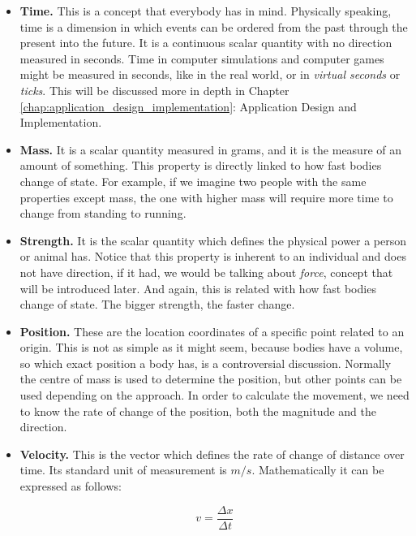 \begin{itemize}

\item{{\bf Time.} This is a concept that everybody has in mind. Physically speaking, time is a dimension in which events can be ordered from the past through the present into the future. It is a continuous scalar quantity with no direction measured in seconds. Time in computer simulations and computer games might be measured in seconds, like in the real world, or in \emph{virtual seconds} or \emph{ticks}. This will be discussed more in depth in Chapter \ref{chap:application_design_implementation}: Application Design and Implementation.}

\item{{\bf Mass.} It is a scalar quantity measured in grams, and it is the measure of an amount of something. This property is directly linked to how fast bodies change of state. For example, if we imagine two people with the same properties except mass, the one with higher mass will require more time to change from standing to running.}

\item{{\bf Strength.} It is the scalar quantity which defines the physical power a person or animal has. Notice that this property is inherent to an individual and does not have direction, if it had, we would be talking about \emph{force}, concept that will be introduced later. And again, this is related with how fast bodies change of state. The bigger strength, the faster change.}

\item{{\bf Position.} These are the location coordinates of a specific point related to an origin. This is not as simple as it might seem, because bodies have a volume, so which exact position a body has, is a controversial discussion. Normally the centre of mass is used to determine the position, but other points can be used depending on the approach. In order to calculate the movement, we need to know the rate of change of the position, both the magnitude and the direction.}

\item{{\bf Velocity.} This is the vector which defines the rate of change of distance over time. Its standard unit of measurement is $m/s$. Mathematically it can be expressed as follows:}

\begin{equation}
  v=\frac{\Delta x}{\Delta t}
\end{equation}


\end{itemize}

